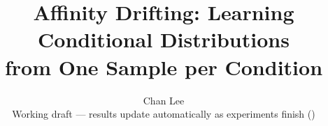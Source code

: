 \documentclass[10pt,twocolumn,letterpaper]{article}
\title{Affinity Drifting: Learning Conditional Distributions\\from One Sample per Condition}
\author{Chan Lee\\
{\small Working draft --- results update automatically as experiments finish (\BuildStamp)}}
\begin{document}
\maketitle








{
    \small
    
    
}


\end{document}
